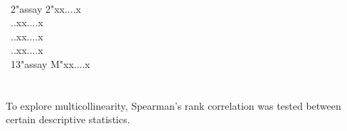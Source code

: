 \documentclass[a4paper,12pt]{article}
\begin{document}
\\ \-\ \hspace{0.5cm}2\hspace{1.4cm}"assay 2"\hspace{1.5cm}x\hspace{2cm}x\hspace{1.64cm}....\hspace{1.6cm}x
\\ \-\ \hspace{0.5cm}.\hspace{1.85cm}.\hspace{2.1cm}x\hspace{2cm}x\hspace{1.64cm}....\hspace{1.6cm}x
\\ \-\ \hspace{0.5cm}.\hspace{1.85cm}.\hspace{2.1cm}x\hspace{2cm}x\hspace{1.64cm}....\hspace{1.6cm}x
\\ \-\ \hspace{0.5cm}.\hspace{1.85cm}.\hspace{2.1cm}x\hspace{2cm}x\hspace{1.64cm}....\hspace{1.6cm}x
\\ \-\ \hspace{0.5cm}13\hspace{1.3cm}"assay M"\hspace{1.38cm}x\hspace{2cm}x\hspace{1.64cm}....\hspace{1.6cm}x
\\ \-\ \hspace{0.5cm}\hspace{1.3cm}\hspace{1.38cm}\hspace{2cm}\hspace{1.64cm}\hspace{1.6cm}
\\ \-\ \hspace{0.5cm}\hspace{1.3cm}\hspace{1.38cm}\hspace{2cm}\hspace{1.64cm}\hspace{1.6cm}
\normalsize
\\To explore multicollinearity, Spearman's rank correlation was tested between certain descriptive statistics.
\end{document}
